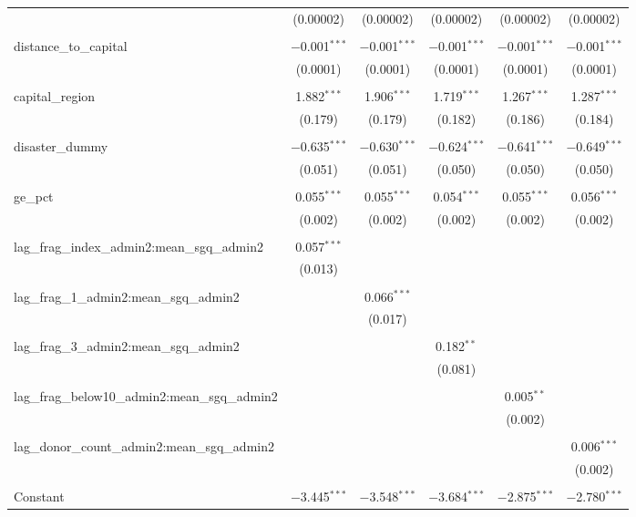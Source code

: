 \begin{table}[!htbp]
\begin{tabular}{@{\extracolsep{5pt}}lccccc}
  & (0.00002) & (0.00002) & (0.00002) & (0.00002) & (0.00002) \\ 
  & & & & & \\ 
 distance\_to\_capital & $-$0.001$^{***}$ & $-$0.001$^{***}$ & $-$0.001$^{***}$ & $-$0.001$^{***}$ & $-$0.001$^{***}$ \\ 
  & (0.0001) & (0.0001) & (0.0001) & (0.0001) & (0.0001) \\ 
  & & & & & \\ 
 capital\_region & 1.882$^{***}$ & 1.906$^{***}$ & 1.719$^{***}$ & 1.267$^{***}$ & 1.287$^{***}$ \\ 
  & (0.179) & (0.179) & (0.182) & (0.186) & (0.184) \\ 
  & & & & & \\ 
 disaster\_dummy & $-$0.635$^{***}$ & $-$0.630$^{***}$ & $-$0.624$^{***}$ & $-$0.641$^{***}$ & $-$0.649$^{***}$ \\ 
  & (0.051) & (0.051) & (0.050) & (0.050) & (0.050) \\ 
  & & & & & \\ 
 ge\_pct & 0.055$^{***}$ & 0.055$^{***}$ & 0.054$^{***}$ & 0.055$^{***}$ & 0.056$^{***}$ \\ 
  & (0.002) & (0.002) & (0.002) & (0.002) & (0.002) \\ 
  & & & & & \\ 
 lag\_frag\_index\_admin2:mean\_sgq\_admin2 & 0.057$^{***}$ &  &  &  &  \\ 
  & (0.013) &  &  &  &  \\ 
  & & & & & \\ 
 lag\_frag\_1\_admin2:mean\_sgq\_admin2 &  & 0.066$^{***}$ &  &  &  \\ 
  &  & (0.017) &  &  &  \\ 
  & & & & & \\ 
 lag\_frag\_3\_admin2:mean\_sgq\_admin2 &  &  & 0.182$^{**}$ &  &  \\ 
  &  &  & (0.081) &  &  \\ 
  & & & & & \\ 
 lag\_frag\_below10\_admin2:mean\_sgq\_admin2 &  &  &  & 0.005$^{**}$ &  \\ 
  &  &  &  & (0.002) &  \\ 
  & & & & & \\ 
 lag\_donor\_count\_admin2:mean\_sgq\_admin2 &  &  &  &  & 0.006$^{***}$ \\ 
  &  &  &  &  & (0.002) \\ 
  & & & & & \\ 
 Constant & $-$3.445$^{***}$ & $-$3.548$^{***}$ & $-$3.684$^{***}$ & $-$2.875$^{***}$ & $-$2.780$^{***}$ \\ 

\end{tabular}
\end{table}
